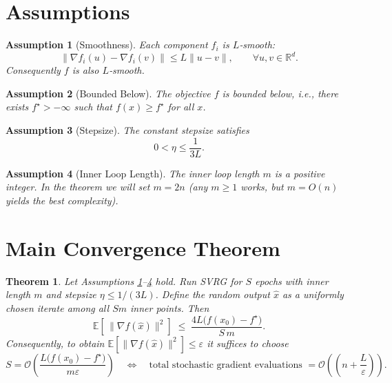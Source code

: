 \documentclass{article}
\newtheorem{theorem}{Theorem}
\newtheorem{assumption}{Assumption}
\newcommand{\EE}{\mathbb{E}}
\newcommand{\grad}{\nabla}
\begin{document}
\section*{Assumptions}
\begin{assumption}[Smoothness]\label{ass:smooth}
Each component $f_i$ is $L$‑smooth:
\[
\|\grad f_i(u)-\grad f_i(v)\|\le L\|u-v\|,\qquad\forall u,v\in\mathbb{R}^d .
\]
Consequently $f$ is also $L$‑smooth.
\end{assumption}
\begin{assumption}[Bounded Below]\label{ass:lower}
The objective $f$ is bounded below, i.e., there exists $f^{\star}>-\infty$ such that $f(x)\ge f^{\star}$ for all $x$.
\end{assumption}
\begin{assumption}[Stepsize]\label{ass:stepsize}
The constant stepsize satisfies
\[
0<\eta\le\frac{1}{3L}.
\]
\end{assumption}
\begin{assumption}[Inner Loop Length]\label{ass:inner}
The inner loop length $m$ is a positive integer. In the theorem we will set $m=2n$ (any $m\ge 1$ works, but $m=O(n)$ yields the best complexity).
\end{assumption}

\section*{Main Convergence Theorem}
\begin{theorem}\label{thm:main}
Let Assumptions \ref{ass:smooth}–\ref{ass:inner} hold. Run SVRG for $S$ epochs with inner length $m$ and stepsize $\eta\le 1/(3L)$. Define the random output $\hat{x}$ as a uniformly chosen iterate among all $Sm$ inner points. Then
\[
\EE\!\left[\,\|\grad f(\hat{x})\|^{2}\right]
\;\le\;
\frac{4L\bigl(f(x_{0})-f^{\star}\bigr)}{S\,m } .
\tag{4}
\]
Consequently, to obtain $\EE[\|\grad f(\hat{x})\|^{2}]\le\varepsilon$ it suffices to choose
\[
S = \mathcal{O}\!\left(\frac{L\bigl(f(x_{0})-f^{\star}\bigr)}{m\varepsilon}\right)
\quad\Longleftrightarrow\quad
\text{total stochastic gradient evaluations } = \mathcal{O}\!\left(\left(n+\frac{L}{\varepsilon}\right)\right).
\]
\end{theorem}
\end{document}
